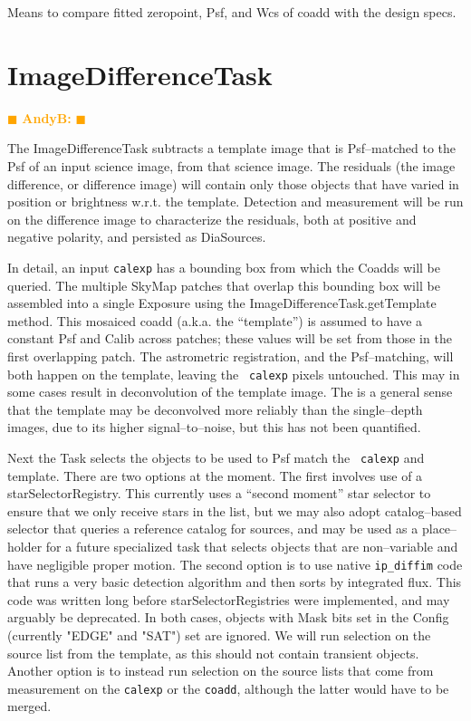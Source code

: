 \documentclass[12pt]{article}
\newcommand{\becker} { \textcolor{orange} {
\ensuremath{\blacksquare} {\bf AndyB:}  
\ensuremath{\blacksquare} } }
\begin{document}
Means to compare fitted zeropoint, Psf, and Wcs of coadd with the
design specs.


\clearpage 
\section{ImageDifferenceTask \label{sec-imagedifftask}} \becker

The ImageDifferenceTask subtracts a template image that is
Psf--matched to the Psf of an input science image, from that science
image.  The residuals (the image difference, or difference image) will
contain only those objects that have varied in position or brightness
w.r.t. the template.  Detection and measurement will be run on the
difference image to characterize the residuals, both at positive and
negative polarity, and persisted as DiaSources.

In detail, an input {\tt calexp} has a bounding box from which the
Coadds will be queried.  The multiple SkyMap patches that overlap this
bounding box will be assembled into a single Exposure using the
ImageDifferenceTask.getTemplate method.  This mosaiced coadd
(a.k.a. the ``template'') is assumed to have a constant Psf and Calib
across patches; these values will be set from those in the first
overlapping patch.  The astrometric registration, and the
Psf--matching, will both happen on the template, leaving the {\tt
  calexp} pixels untouched.  This may in some cases result in
deconvolution of the template image.  The is a general sense that the
template may be deconvolved more reliably than the single--depth
images, due to its higher signal--to--noise, but this has not been
quantified.

Next the Task selects the objects to be used to Psf match the {\tt
  calexp} and template.  There are two options at the moment.  The
first involves use of a starSelectorRegistry.  This currently uses a
``second moment'' star selector to ensure that we only receive stars
in the list, but we may also adopt catalog--based selector that
queries a reference catalog for sources, and may be used as a
place--holder for a future specialized task that selects objects that
are non--variable and have negligible proper motion.  The second
option is to use native {\tt ip\_diffim} code that runs a very basic
detection algorithm and then sorts by integrated flux.  This code was
written long before starSelectorRegistries were implemented, and may
arguably be deprecated.  In both cases, objects with Mask bits set in
the Config (currently "EDGE" and "SAT") set are ignored.  We will run
selection on the source list from the template, as this should not
contain transient objects.  Another option is to instead run selection
on the source lists that come from measurement on the {\tt calexp} or
the {\tt coadd}, although the latter would have to be merged.
\end{document}
